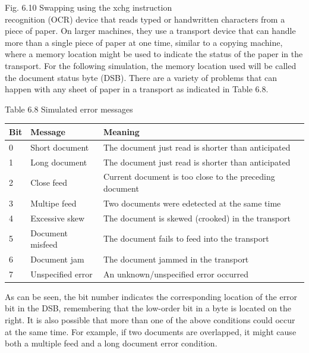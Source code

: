 \documentclass[10pt]{article}
\begin{document}
Fig. 6.10 Swapping using the xchg instruction\\
recognition (OCR) device that reads typed or handwritten characters from a piece of paper. On larger machines, they use a transport device that can handle more than a single piece of paper at one time, similar to a copying machine, where a memory location might be used to indicate the status of the paper in the transport. For the following simulation, the memory location used will be called the document status byte (DSB). There are a variety of problems that can happen with any sheet of paper in a transport as indicated in Table 6.8.

Table 6.8 Simulated error messages

\begin{center}
\begin{tabular}{|lll|}
\hline
Bit & Message & Meaning \\
\hline
0 & Short document & The document just read is shorter than anticipated \\
1 & Long document & The document just read is shorter than anticipated \\
2 & Close feed & Current document is too close to the preceding document \\
3 & Multipe feed & Two documents were edetected at the same time \\
4 & Excessive skew & The document is skewed (crooked) in the transport \\
5 & Document misfeed & The document fails to feed into the transport \\
6 & Document jam & The document jammed in the transport \\
7 & Unspecified error & An unknown/unspecified error occurred \\
\hline
\end{tabular}
\end{center}

As can be seen, the bit number indicates the corresponding location of the error bit in the DSB, remembering that the low-order bit in a byte is located on the right. It is also possible that more than one of the above conditions could occur at the same time. For example, if two documents are overlapped, it might cause both a multiple feed and a long document error condition.
\end{document}
